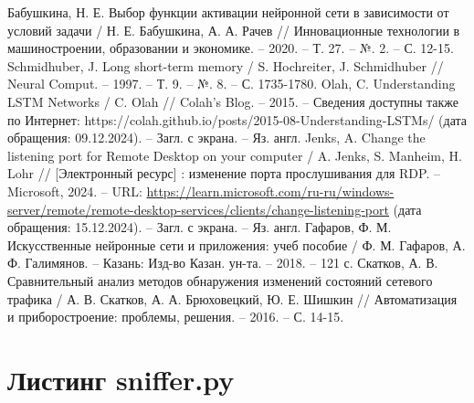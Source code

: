\documentclass[spec, och, diploma]{SCWorks}
\begin{document}
\begin{thebibliography}{25}
    Бабушкина, Н. Е. Выбор функции активации нейронной сети в зависимости от условий задачи / Н. Е. Бабушкина, А. А. Рачев // Инновационные технологии в 
    машиностроении, образовании и экономике. -- 2020. -- Т. 27. -- №. 2. -- С. 12-15.
    Schmidhuber, J. Long short-term memory / S. Hochreiter, J. Schmidhuber // Neural Comput. -- 1997. -- Т. 9. -- №. 8. -- С. 1735-1780.
    Olah, C. Understanding LSTM Networks / C. Olah // Colah's Blog. -- 2015. -- Сведения доступны также по Интернет: https://colah.github.io/posts/2015-08-Understanding-LSTMs/ (дата обращения: 09.12.2024). -- Загл. с экрана. -- Яз. англ.
    Jenks, A. Change the listening port for Remote Desktop on your computer / A. Jenks, S. Manheim, H. Lohr // [Электронный ресурс] : изменение порта прослушивания для RDP. -- Microsoft, 2024. -- URL: \url{https://learn.microsoft.com/ru-ru/windows-server/remote/remote-desktop-services/clients/change-listening-port} (дата обращения: 15.12.2024). -- Загл. с экрана. -- Яз. англ.
    Гафаров, Ф. М. Искусственные нейронные сети и приложения: учеб пособие / Ф. М. Гафаров, А. Ф. Галимянов. -- Казань: Изд-во Казан. ун-та. -- 2018. -- 121 с.
    Скатков, А. В. Сравнительный анализ методов обнаружения изменений состояний сетевого трафика / А. В. Скатков, А. А. Брюховецкий, Ю. Е. Шишкин //
    Автоматизация и приборостроение: проблемы, решения. -- 2016. -- С. 14-15.

  \end{thebibliography}

  \appendix

    \section{Листинг sniffer.py}
\end{document}
